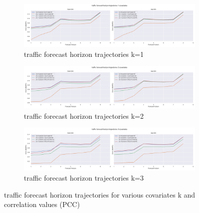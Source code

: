 \documentclass{article}
\begin{document}
\begin{figure}[tbp]
\begin{subfigure}{\textwidth}
\centering
\includegraphics[width=\linewidth]{figures/models_traf_k1.png}
\caption{traffic forecast horizon trajectories k=1}
\label{fig:base-lstm_seg-lstm_traffic_k_1_trajectory}
\end{subfigure}

\begin{subfigure}{\textwidth}
\centering
\includegraphics[width=\linewidth]{figures/models_traf_k2.png}
\caption{traffic forecast horizon trajectories k=2}
\label{fig:base-lstm_seg-lstm_traffic_k_2_trajectory}
\end{subfigure}

\begin{subfigure}{\textwidth}
\centering
\includegraphics[width=\linewidth]{figures/models_traf_k3.png}
\caption{traffic forecast horizon trajectories k=3}
\label{fig:base-lstm_seg-lstm_traffic_k_3_trajectory}
\end{subfigure}
\caption{traffic forecast horizon trajectories for various covariates k and correlation values (PCC)}
\label{fig:base-lstm_seg-lstm_traffic_trajectory}
\end{figure}
\end{document}
